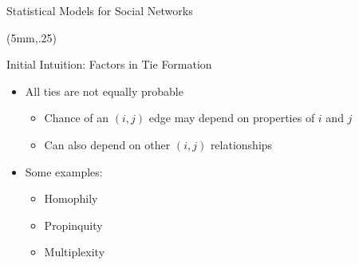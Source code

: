 \documentclass[10pt]{beamer}
\begin{document}
\begin{frame}{Statistical Models for Social Networks}
{\begin{textblock*}{60mm}(5mm,.25\textheight)
\begin{block}{Initial Intuition: Factors in Tie Formation}
\begin{itemize}
\item All ties are not equally probable 
\begin{itemize}
\item Chance of an $(i,j)$ edge may depend on properties of $i$ and $j$
\item Can also depend on other $(i,j)$ relationships
\end{itemize}
\item Some examples:
\begin{itemize}
\item Homophily
\item Propinquity
\item Multiplexity
\end{itemize}
\end{itemize}
\end{block}
\end{textblock*}
}
\end{frame}
\end{document}
